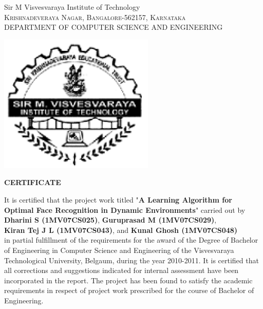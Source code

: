 \newcommand{\tabcer}{\hspace*{1 cm}}
%
\thispagestyle{empty}

\begin{center}
\LARGE{Sir M Visvesvaraya Institute of Technology}\\
\vspace{1mm}
\normalsize\textsc{Krishnadeveraya Nagar, Bangalore-562157, Karnataka\\ }
\vspace{3mm}
\normalsize{DEPARTMENT OF COMPUTER SCIENCE  AND  ENGINEERING}

\vspace{3mm}
\includegraphics[scale=0.80]{spicture1.eps}

\vspace{3mm}

\textup{\Large \textbf{CERTIFICATE}} 							
\vspace{3mm}
\end{center} 								

It is certified that the project work titled "\textbf{A Learning Algorithm for \\
Optimal Face Recognition in Dynamic Environments}" carried out by \\
\textbf{Dharini S (1MV07CS025)}, \textbf{Guruprasad M (1MV07CS029)}, \\ \textbf{Kiran Tej J L (1MV07CS043)}, and \textbf{Kunal Ghosh (1MV07CS048)} \\
in partial fulfillment of the requirements for the award of the Degree of Bachelor of Engineering in Computer Science and Engineering of the Visvesvaraya Technological University, Belgaum, during the year 2010-2011. It is certified that all corrections and suggestions indicated for internal assessment have been incorporated in the report. The project has been found to satisfy the academic requirements in respect of project work prescribed for the course of Bachelor of Engineering. \\ \\

